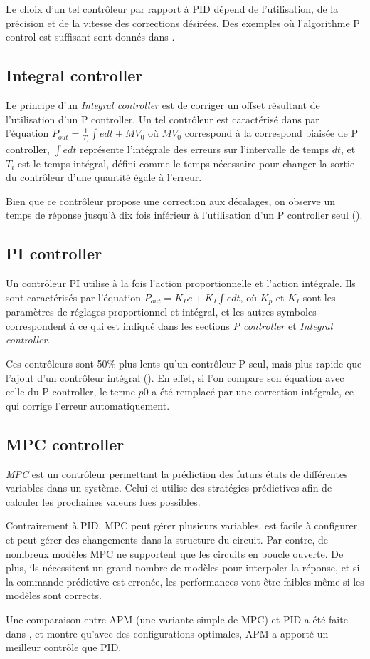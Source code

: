 Le choix d'un tel contrôleur par rapport à PID dépend de l'utilisation, de la précision et de la vitesse des corrections désirées. Des exemples où l'algorithme P control est suffisant sont donnés dans \cite{sellers2001overview}.

\subsection{Integral controller}
Le principe d'un \emph{Integral controller} est de corriger un offset résultant de l'utilisation d'un P controller. Un tel contrôleur est caractérisé dans \cite{svrcek2006real} par l'équation $P_{out} = \frac{1}{T_{i}}\int e dt + MV_{0}$ où $MV_{0}$ correspond à la correspond biaisée de P controller, $\int e dt$ représente l'intégrale des erreurs sur l'intervalle de temps $dt$, et $T_{i}$ est le temps intégral, défini comme le temps nécessaire pour changer la sortie du contrôleur d'une quantité égale à l'erreur.

Bien que ce contrôleur propose une correction aux décalages, on observe un temps de réponse jusqu'à dix fois inférieur à l'utilisation d'un P controller seul (\cite{svrcek2006real}).

\subsection{PI controller}
Un contrôleur PI utilise à la fois l'action proportionnelle et l'action intégrale. Ils sont caractérisés par l'équation $P_{out} = K_{P} e + K_{I} \int e dt$, où $K_{p}$ et $K_{I}$ sont les paramètres de réglages proportionnel et intégral, et les autres symboles correspondent à ce qui est indiqué dans les sections \emph{P controller} et \emph{Integral controller}.

Ces contrôleurs sont 50\% plus lents qu'un contrôleur P seul, mais plus rapide que l'ajout d'un contrôleur intégral (\cite{svrcek2006real}). En effet, si l'on compare son équation avec celle du P controller, le terme $p0$ a été remplacé par une correction intégrale, ce qui corrige l'erreur automatiquement.

\subsection{MPC controller}
\emph{MPC} est un contrôleur permettant la prédiction des futurs états de différentes variables dans un système. Celui-ci utilise des stratégies prédictives afin de calculer les prochaines valeurs lues possibles.

Contrairement à PID, MPC peut gérer plusieurs variables, est facile à configurer et peut gérer des changements dans la structure du circuit. Par contre, de nombreux modèles MPC ne supportent que les circuits en boucle ouverte. De plus, ils nécessitent un grand nombre de modèles pour interpoler la réponse, et si la commande prédictive est erronée, les performances vont être faibles même si les modèles sont corrects.

Une comparaison entre APM (une variante simple de MPC) et PID a été faite dans \cite{saletovic2014apm}, et montre qu'avec des configurations optimales, APM a apporté un meilleur contrôle que PID.